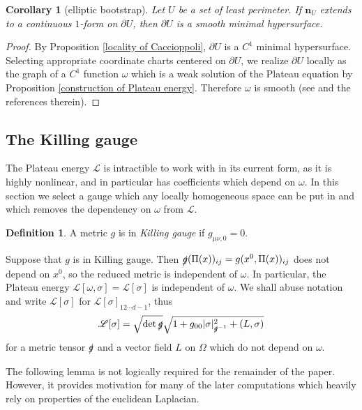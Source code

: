 \documentclass[reqno,12pt,letterpaper]{amsart}
\newcommand{\Lagrange}{\mathscr L}
\newcommand{\normal}{\mathbf n}
\newcommand{\dfn}[1]{\emph{#1}\index{#1}}
\newtheorem{corollary}[theorem]{Corollary}
\theoremstyle{definition}
\newtheorem{definition}[theorem]{Definition}
\numberwithin{equation}{section}
\begin{document}
\begin{corollary}[elliptic bootstrap]\label{C1 implies smooth}
Let $U$ be a set of least perimeter. If $\normal_U$ extends to a continuous $1$-form on $\partial U$, then $\partial U$ is a smooth minimal hypersurface.
\end{corollary}
\begin{proof}
By Proposition \ref{locality of Caccioppoli}, $\partial U$ is a $C^1$ minimal hypersurface.
Selecting appropriate coordinate charts centered on $\partial U$, we realize $\partial U$ locally as the graph of a $C^1$ function $\omega$ which is a weak solution of the Plateau equation by Proposition \ref{construction of Plateau energy}.
Therefore $\omega$ is smooth (see \cite[\S8.3.2]{evans2010partial} and the references therein).
\end{proof}

\subsection{The Killing gauge}
The Plateau energy $\Lagrange$ is intractible to work with in its current form, as it is highly nonlinear, and in particular has coefficients which depend on $\omega$.
In this section we select a gauge which any locally homogeneous space can be put in and which removes the dependency on $\omega$ from $\Lagrange$.

\begin{definition}
A metric $g$ is in \dfn{Killing gauge} if $g_{\mu\nu, 0} = 0$.
\end{definition}

Suppose that $g$ is in Killing gauge. Then $\slashed g(\Pi(x))_{ij} = g(x^0, \Pi(x))_{ij}$ does not depend on $x^0$, so the reduced metric is independent of $\omega$.
In particular, the Plateau energy $\Lagrange[\omega, \sigma] = \Lagrange[\sigma]$ is independent of $\omega$.
We shall abuse notation and write $\Lagrange[\sigma]$ for $\Lagrange[\sigma]_{12\cdots d - 1}$, thus
\begin{equation}\label{Lagrangian in coords}
\Lagrange[\sigma] = \sqrt{\det \slashed g} \sqrt{1 + g_{00} |\sigma|_{\slashed g^{-1}}^2 + (L, \sigma)}
\end{equation}
for a metric tensor $\slashed g$ and a vector field $L$ on $\Omega$ which do not depend on $\omega$.

The following lemma is not logically required for the remainder of the paper.
However, it provides motivation for many of the later computations which heavily rely on properties of the euclidean Laplacian.
\end{document}
